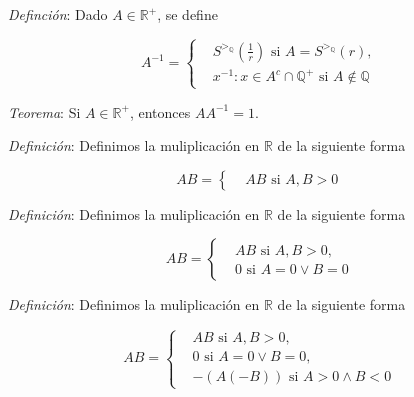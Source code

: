 \documentclass{beamer}
\begin{document}
  \begin{frame}
    \textit{Definción}: Dado $A \in \mathbb{R}^+$, se define 
    
    \begin{equation*}
      A^{-1} = \left\{
      \begin{aligned}
        &S^{>_\mathbb{Q}}(\frac{1}{r}) \text{ si } A = S^{>_\mathbb{Q}}(r), \\
        &{x^{-1}: x \in A^c \cap \mathbb{Q}^+} \text{ si } A \not\in \mathbb{Q}
      \end{aligned}
      \right.
    \end{equation*}
  \end{frame}

  \begin{frame}
    
    \textit{Teorema}: Si $A \in \mathbb{R}^+$, entonces $A A^{-1} = 1$.
  \end{frame}

  \begin{frame}
    \textit{Definición}: Definimos la muliplicación en $\mathbb{R}$ de la siguiente forma

    \begin{equation*}
      AB = \left\{
      \begin{aligned}
        &AB \text{ si } A, B > 0
      \end{aligned}
      \right.
    \end{equation*}
  \end{frame}


  \begin{frame}
    \textit{Definición}: Definimos la muliplicación en $\mathbb{R}$ de la siguiente forma

    \begin{equation*}
      AB = \left\{
      \begin{aligned}
        &AB \text{ si } A, B > 0, \\
        &0 \text{ si } A = 0 \lor B = 0
      \end{aligned}
      \right.
    \end{equation*}
  \end{frame}


  \begin{frame}
    \textit{Definición}: Definimos la muliplicación en $\mathbb{R}$ de la siguiente forma

    \begin{equation*}
      AB = \left\{
      \begin{aligned}
        &AB \text{ si } A, B > 0, \\
        &0 \text{ si } A = 0 \lor B = 0, \\
        &-(A(-B)) \text{ si } A > 0 \land B < 0
      \end{aligned}
      \right.
    \end{equation*}
  \end{frame}
\end{document}
